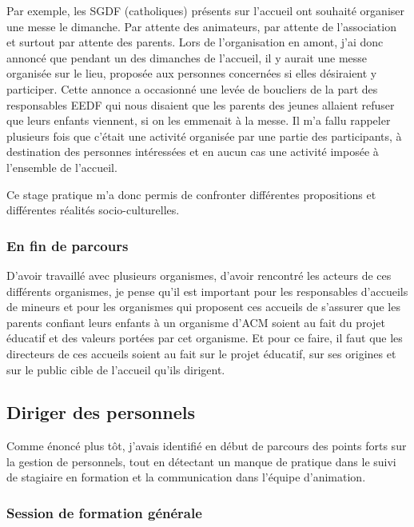 \documentclass[titlepage,11pt,a4paper]{article}
\begin{document}
Par exemple, les SGDF (catholiques) présents sur l'accueil ont souhaité organiser une
messe le dimanche. Par attente des animateurs, par attente de l'association et surtout
par attente des parents. Lors de l'organisation en amont, j'ai donc annoncé que pendant
un des dimanches de l'accueil, il y aurait une messe organisée sur le lieu, proposée aux personnes
concernées si elles désiraient y participer. Cette annonce a occasionné une levée de
boucliers de la part des responsables EEDF qui nous disaient que les parents des jeunes
allaient refuser que leurs enfants viennent, si on les emmenait à la messe. Il m'a fallu
rappeler plusieurs fois que c'était une activité organisée par une partie des
participants, à destination des personnes intéressées et en aucun cas une activité imposée
à l'ensemble de l'accueil.

Ce stage pratique m'a donc permis de confronter différentes propositions et différentes
réalités socio-culturelles.

\subsubsection{En fin de parcours}

D'avoir travaillé avec plusieurs organismes, d'avoir rencontré les acteurs de ces
différents organismes, je pense qu'il est important pour les responsables d'accueils de
mineurs et pour les organismes qui proposent ces accueils de s'assurer que les parents
confiant leurs enfants à un organisme d’ACM soient au fait du projet éducatif et des
valeurs portées par cet organisme. Et pour ce faire, il faut que les directeurs de ces
accueils soient au fait sur le projet éducatif, sur ses origines et sur le public cible de
l'accueil qu'ils dirigent.

\subsection{Diriger des personnels}

Comme énoncé plus tôt, j'avais identifié en début de parcours des points forts sur la
gestion de personnels, tout en détectant un manque de pratique dans le suivi de stagiaire
en formation et la communication dans l'équipe d'animation.

\subsubsection{Session de formation générale}
\end{document}
